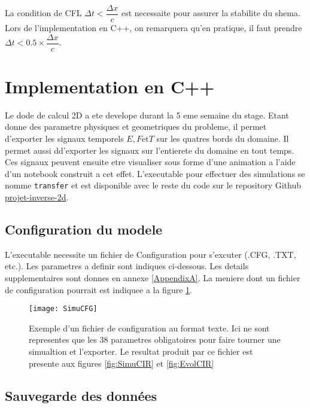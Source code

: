 La condition de CFL $\Delta t < \dfrac{\Delta x}{c}$ est necessaite pour assurer la stabilite du shema. Lors de l'implementation en C++, on remarquera qu'en pratique, il faut prendre $\Delta t < 0.5 \times \dfrac{\Delta x}{c}.$ 

\section{Implementation en C++}

Le dode de calcul 2D a ete develope durant la 5 eme semaine du stage. Etant donne des parametre physiques et geometriques du probleme, il permet d'exporter les signaux temporels $E, F \text{et} T$ sur les quatres bords du domaine. Il permet aussi dd'exporter les signaux sur l'entierete du domaine en tout temps. Ces signaux peuvent ensuite etre visualiser sous forme d'une animation a l'aide d'un notebook construit a cet effet. L'executable pour effectuer des simulations se nomme \verb|transfer| et est disponible avec le reste du code sur le repository Github \href{https://github.com/desmond-rn/projet-inverse-2d}{projet-inverse-2d}.

\subsection{Configuration du modele}

L'executable necessite un fichier de Configuration pour s'excuter (.CFG, .TXT, etc.). Les parametres a definir sont indiques ci-dessous. Les details supplementaires sont donnes en annexe \ref{AppendixA}. La meniere dont un fichier de configuration pourrait est indiquee a la figure \ref{fig:SimuCFG}.

\begin{figure}[!h]
\centering
\texttt{[image: SimuCFG]} 
\decoRule
\caption[SimuCFG]{Exemple d'un fichier de configuration au format texte. Ici ne sont representes que les 38 parametres obligatoires pour faire tourner une simualtion et l'exporter. Le resultat produit par ce fichier est presente aux figures \ref{fig:SimuCIR} et \ref{fig:EvolCIR}}
\label{fig:SimuCFG}
\end{figure}


\subsection{Sauvegarde des données}

